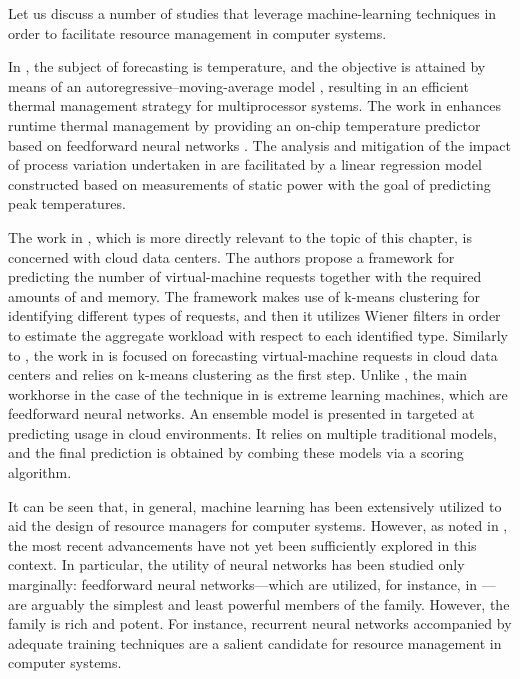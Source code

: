 Let us discuss a number of studies that leverage machine-learning techniques in
order to facilitate resource management in computer systems.

In \cite{coskun2008}, the subject of forecasting is temperature, and the
objective is attained by means of an autoregressive--moving-average model
\cite{hastie2013}, resulting in an efficient thermal management strategy for
multiprocessor systems. The work in \cite{kumar2010} enhances runtime thermal
management by providing an on-chip temperature predictor based on feedforward
neural networks \cite{hastie2013}. The analysis and mitigation of the impact of
process variation undertaken in \cite{juan2014} are facilitated by a linear
regression model \cite{hastie2013} constructed based on measurements of static
power with the goal of predicting peak temperatures.

The work in \cite{dabbagh2015}, which is more directly relevant to the topic of
this chapter, is concerned with cloud data centers. The authors propose a
framework for predicting the number of virtual-machine requests together with
the required amounts of  and memory. The framework makes use of k-means
clustering \cite{hastie2013} for identifying different types of requests, and
then it utilizes Wiener filters in order to estimate the aggregate workload with
respect to each identified type. Similarly to \cite{dabbagh2015}, the work in
\cite{ismaeel2015} is focused on forecasting virtual-machine requests in cloud
data centers and relies on k-means clustering as the first step. Unlike
\cite{dabbagh2015}, the main workhorse in the case of the technique in
\cite{ismaeel2015} is extreme learning machines, which are feedforward neural
networks. An ensemble model \cite{hastie2013} is presented in \cite{cao2014}
targeted at predicting  usage in cloud environments. It relies on
multiple traditional models, and the final prediction is obtained by combing
these models via a scoring algorithm.

It can be seen that, in general, machine learning has been extensively utilized
to aid the design of resource managers for computer systems. However, as noted
in , the most recent advancements have not yet been
sufficiently explored in this context. In particular, the utility of neural
networks has been studied only marginally: feedforward neural networks---which
are utilized, for instance, in \cite{kumar2010, ismaeel2015}---are arguably the
simplest and least powerful members of the family. However, the family is rich
and potent. For instance, recurrent neural networks accompanied by adequate
training techniques \cite{goodfellow2016} are a salient candidate for resource
management in computer systems.

